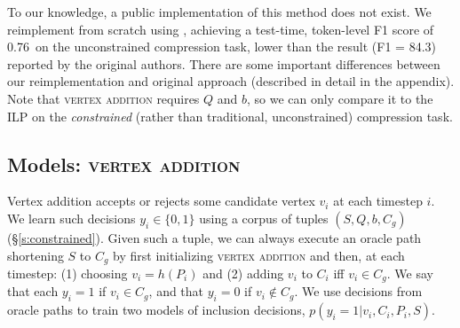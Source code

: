 \documentclass[11pt,a4paper]{article}
\newcommand{\ilptest}[0]{0.76~}
\begin{document}
To our knowledge, a public implementation of this method does not exist. We reimplement from scratch using \citet{gurobi}, achieving a test-time, token-level F1 score of \ilptest on the unconstrained compression task, lower than the result {\small (F1 = 84.3)} reported by the original authors. There are some important differences between our reimplementation and original approach (described in detail in the appendix). Note that \textsc{vertex addition} requires $Q$ and $b$, so we can only compare it to the ILP on the \textit{constrained} (rather than traditional, unconstrained) compression task.

\subsection{Models: \textsc{vertex addition}}\label{s:transition}

Vertex addition accepts or rejects some candidate vertex $v_i$ at each timestep $i$. 
We learn such decisions $y_i \in \{0,1\}$ using a corpus of tuples $(S,Q,b,C_g)$ (\S\ref{s:constrained}). Given such a tuple, we can always execute an oracle path shortening $S$ to $C_g$ by first initializing \textsc{vertex addition} and then, at each timestep: (1) choosing $v_i = h(P_i)$ and (2) adding $v_i$ to $C_i$ iff $v_i \in C_g$. We say that each $y_i=1$ if $v_i \in C_g$, and that $y_i=0$ if $v_i \notin C_g$. We use decisions from oracle paths to train two models of inclusion decisions, ${p(y_i  = 1 | v_i, C_i, P_i, S)}$.
\end{document}
